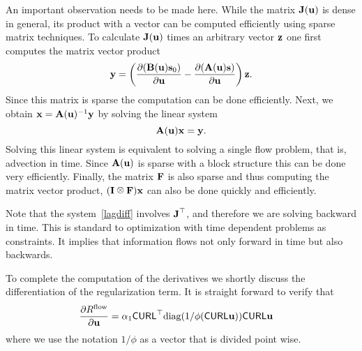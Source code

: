 \documentclass[english]{siamltex}
\newcommand {\bu}   { {\bf u} }          			%
\newcommand {\bfx}  { {\bf x} }
\newcommand {\bfs}   { {\bf s} }
\newcommand {\bfu}   { {\bf u} }
\newcommand {\bfz}   { {\bf z} }
\newcommand {\bfy}   { {\bf y} }
\newcommand {\bfA}  { {\bf A} }
\newcommand {\bfF}  { {\bf F} }
\newcommand {\bfI}  { {\bf I} }
\renewcommand {\diag}	 { \mathrm{diag} }
\newcommand{\bA}  { {\bf A} }      %
\newcommand{\bB}  { {\bf B} }      %
\newcommand{\bfJ}  {\text{{\bf J}}} %
\newcommand{\CURLh}  {{\textsf{CURL}}} %
\def\kronecker{\raisebox{1pt}{\ensuremath{\:\otimes\:}}}
\begin{document}
\bigskip

An important observation needs to be made here. While the matrix $\bfJ(\bfu)$ is dense in general, its product
with a vector can be computed efficiently using sparse matrix techniques.
To calculate $\bfJ(\bfu)$ times an arbitrary vector $\bfz$ one first computes  the matrix vector product
$$\bfy = \left(  \frac{\partial(\bB(\bu) \bfs_{0})}{\partial \bu}  -\frac{\partial (\bA(\bu)\bfs)}{\partial \bu} \right) \bfz.$$
Since this matrix is sparse the computation can be done efficiently.
Next, we obtain $\bfx =\bfA(\bfu)^{-1} \bfy$ by solving the linear system
$$ \bfA(\bfu) \bfx = \bfy. $$
Solving this linear system is equivalent to solving a single flow problem, that is, advection in time.
Since $\bfA(\bfu)$ is sparse with a block structure this can be done very efficiently.
Finally, the matrix $\bfF$ is also sparse and thus computing the matrix vector product,
  $(\bfI \kronecker \bfF)\bfx$
can also be done quickly and efficiently.

Note that the system~\eqref{lagdiff} involves $\bfJ^{\top}$, and therefore we are solving backward in time.
This is standard to optimization with time dependent problems as constraints. It implies that
information flows not only forward in time but also backwards.


\bigskip

To complete the computation of the derivatives we shortly discuss the differentiation of the regularization
term. 
It is straight forward to verify that 
\begin{eqnarray}
	\frac{\partial R^{\rm flow}}{\partial \bu} &= \alpha_{1} \CURLh^{\top} \diag(1/\phi(\CURLh \bu )) \CURLh \bu 
\end{eqnarray}
where we use the notation $1/\phi$ as a vector that is divided point wise.


\bigskip
\end{document}
